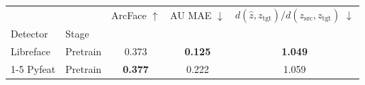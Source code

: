 \begin{tabular}{llccc}
\toprule
 &  & ArcFace $\uparrow$ & AU MAE $\downarrow$ & $d(\hat{z}, z_\mathrm{tgt}) / d(z_\mathrm{src}, z_\mathrm{tgt})$ $\downarrow$ \\
Detector & Stage &  &  &  \\
\midrule
Libreface & Pretrain & 0.373 & \textbf{0.125} & \textbf{1.049} \\
\cmidrule{1-5}
Pyfeat & Pretrain & \textbf{0.377} & 0.222 & 1.059 \\
\bottomrule
\end{tabular}